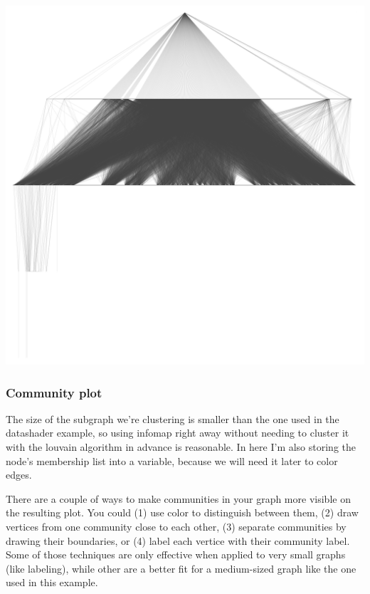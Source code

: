 \documentclass[12pt, a4paper]{article}
\begin{document}
  {\centering
  \includegraphics[width=\columnwidth]{src/youtube/hdg/comp/9_plot_sgy}
  \label{fig:hdg_c9}}

\newpage
\subsubsection{Community plot}

The size of the subgraph we're clustering is smaller than the one used in the datashader example, so using infomap right away without needing to cluster it with the louvain algorithm in advance is reasonable. In here I'm also storing the node's membership list into a variable, because we will need it later to color edges.



There are a couple of ways to make communities in your graph more visible on the resulting plot. You could (1) use color to distinguish between them, (2) draw vertices from one community close to each other, (3) separate communities by drawing their boundaries, or (4) label each vertice with their community label. Some of those techniques are only effective when applied to very small graphs (like labeling), while other are a better fit for a medium-sized graph like the one used in this example.
\end{document}
